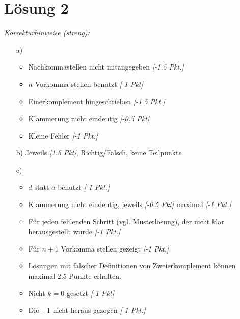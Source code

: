 \documentclass{scrartcl}[11pt]
\begin{document}
\pagebreak

\section*{Lösung 2}

\emph{Korrekturhinweise (streng):}
\begin{itemize}
  \item[a)]
  \begin{itemize}
    \item Nachkommastellen nicht mitangegeben \emph{[-1.5 Pkt.]}
    \item $n$ Vorkomma stellen benutzt \emph{[-1 Pkt]}
    \item Einerkomplement hingeschrieben \emph{[-1.5 Pkt.]}
    \item Klammerung nicht eindeutig \emph{[-0.5 Pkt]}
    \item Kleine Fehler \emph{[-1 Pkt.]}
  \end{itemize}
  \item[b)] Jeweils \emph{[1.5 Pkt]}, Richtig/Falsch, keine Teilpunkte
  \item[c)]
  \begin{itemize}
    \item $d$ statt $a$ benutzt \emph{[-1 Pkt.]}
    \item Klammerung nicht eindeutig, jeweils \emph{[-0.5 Pkt]} maximal \emph{[-1 Pkt.]}
    \item Für jeden fehlenden Schritt (vgl. Musterlösung), der nicht klar herausgestellt wurde \emph{[-1 Pkt.]}
    \item Für $n+1$ Vorkomma stellen gezeigt \emph{[-1 Pkt.]}
    \item Lösungen mit falscher Definitionen von Zweierkomplement können maximal $2.5$ Punkte erhalten.
    \item Nicht $k=0$ gesetzt \emph{[-1 Pkt]}
    \item Die $-1$ nicht heraus gezogen \emph{[-1 Pkt.]}
  \end{itemize}
\end{itemize}
\end{document}
